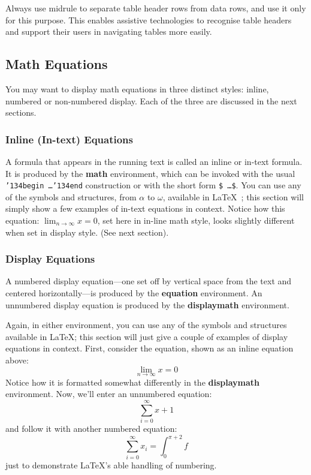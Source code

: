 Always use midrule to separate table header rows from data rows, and use it only for this purpose. This enables assistive technologies to recognise table headers and support their users in navigating tables more easily.

\subsection{Math Equations}

You may want to display math equations in three distinct styles: inline, numbered or non-numbered display.  Each of the three are discussed in the next sections.

\subsubsection{Inline (In-text) Equations}

A formula that appears in the running text is called an inline or in-text formula.  It is produced by the \textbf{math} environment, which can be invoked with the usual \texttt{{\char'134}begin\,\ldots{\char'134}end} construction or with the short form \texttt{\$\,\ldots\$}. You can use any of the symbols and structures, from $\alpha$ to $\omega$, available in \LaTeX~\cite{Lamport:LaTeX}; this section will simply show a few examples of in-text equations in context. Notice how this equation:
\begin{math}
	\lim_{n\rightarrow \infty}x=0
\end{math},
set here in in-line math style, looks slightly different when set in display style.  (See next section).

\subsubsection{Display Equations}

A numbered display equation---one set off by vertical space from the text and centered horizontally---is produced by the \textbf{equation} environment. An unnumbered display equation is produced by the \textbf{displaymath} environment.

Again, in either environment, you can use any of the symbols and structures available in \LaTeX\@; this section will just give a couple of examples of display equations in context.  First, consider the
equation, shown as an inline equation above:
\begin{equation}
	\lim_{n\rightarrow \infty}x=0
\end{equation}
Notice how it is formatted somewhat differently in the \textbf{displaymath} environment.  Now, we'll enter an unnumbered equation:
\begin{displaymath}
	\sum_{i=0}^{\infty} x + 1
\end{displaymath}
and follow it with another numbered equation:
\begin{equation}
	\sum_{i=0}^{\infty}x_i=\int_{0}^{\pi+2} f
\end{equation}
just to demonstrate \LaTeX's able handling of numbering.

